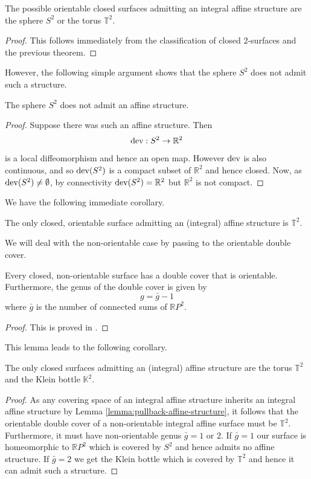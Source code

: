 \begin{corollary}
    The possible orientable closed surfaces admitting an integral affine structure are the sphere $S^2$ or the torus $\mathbb{T}^2$.
\end{corollary}

\begin{proof}
    This follows immediately from the classification of closed 2-surfaces and the previous theorem.
\end{proof}

However, the following simple argument shows that the sphere $S^2$ does not
admit such a structure.

\begin{prop}
    The sphere $S^2$ does not admit an affine structure.
\end{prop}

\begin{proof}
    Suppose there was such an affine structure. Then
    $$\text{dev} : S^2 \to \mathbb{R}^2$$
    is a local diffeomorphism and hence an open map. However $\text{dev}$ is also continuous, and so $\text{dev}(S^2)$ is a compact subset of $\mathbb{R}^2$ and hence closed.
    Now, as $\text{dev}(S^2) \neq \emptyset$, by connectivity $\text{dev}(S^2) = \mathbb{R}^2$ but $\mathbb{R}^2$ is not compact.
\end{proof}
We have the following immediate corollary.
\begin{corollary}
    The only closed, orientable surface admitting an (integral) affine structure is $\mathbb{T}^2$.
\end{corollary}

We will deal with the non-orientable case by passing to the orientable double
cover.
\begin{lemma}
    Every closed, non-orientable surface has a double cover that is orientable. Furthermore, the genus of the double cover is given by
    $$g = \bar{g} -1 $$
    where $\bar{g}$ is the number of connected sums of $\mathbb{R}P^2$.
\end{lemma}
\begin{proof}
    This is proved in \cite{Hatcher}.
\end{proof}

This lemma leads to the following corollary.
\begin{corollary}
    The only closed surfaces admitting an (integral) affine structure are the torus $\mathbb{T}^2$ and the Klein bottle $\mathbb{K}^2$.
\end{corollary}
\begin{proof}
    As any covering space of an integral affine structure inherits an integral affine structure by Lemma \ref{lemma:pullback-affine-structure}, it follows that the
    orientable double cover of a non-orientable integral affine surface must be $\mathbb{T}^2$. Furthermore, it must have non-orientable genus $\bar{g}= 1 \text{ or } 2$. If $\bar{g}=1$ our surface is homeomorphic to $\mathbb{R}P^2$ which is covered by
    $S^2$ and hence admits no affine structure. If $\bar{g} = 2$ we get the Klein bottle which is covered by $\mathbb{T}^2$ and hence it can admit such a structure.
\end{proof}

